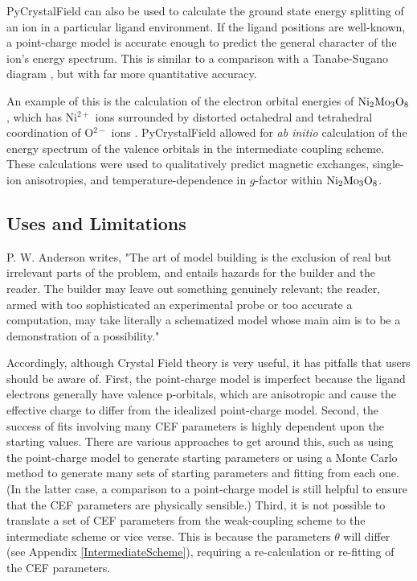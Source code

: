 \documentclass[twocolumn,english,prb]{revtex4-2}
\begin{document}
PyCrystalField can also be used to calculate the ground state energy splitting of an ion in a particular ligand environment. If the ligand positions are well-known, a point-charge model is accurate enough to predict the general character of the ion's energy spectrum. This is similar to a comparison with a Tanabe-Sugano diagram \cite{AbragamBleaney}, but with far more quantitative accuracy.

An example of this is the calculation of the electron orbital energies of $\rm Ni_2Mo_3O_8$, which has Ni$^{2+}$ ions surrounded by distorted octahedral and tetrahedral coordination of O$^{2-}$ ions \cite{JenHoneycomb}. PyCrystalField allowed for \textit{ab initio} calculation of the energy spectrum of the valence orbitals in the intermediate coupling scheme. These calculations were used to qualitatively predict magnetic exchanges, single-ion anisotropies, and temperature-dependence in $g$-factor within $\rm Ni_2Mo_3O_8$.

\subsection{Uses and Limitations}


P. W. Anderson writes,
"The art of model building is the exclusion of real but irrelevant parts of the problem, and entails hazards for the builder and the reader. The builder may leave out something genuinely relevant; the reader, armed with too sophisticated an experimental probe or too accurate a computation, may take literally a schematized model whose main aim is to be a demonstration of a possibility." \cite{anderson1978local}

Accordingly,
although Crystal Field theory is very useful, it has pitfalls that users should be aware of. First, the point-charge model is imperfect because the ligand electrons generally have valence p-orbitals, which are anisotropic and cause the effective charge to differ from the idealized point-charge model. Second, the success of fits involving many CEF parameters is highly dependent upon the starting values. There are various approaches to get around this, such as using the point-charge model to generate starting parameters or using a Monte Carlo method to generate many sets of starting parameters and fitting from each one. (In the latter case, a comparison to a point-charge model is still helpful to ensure that the CEF parameters are physically sensible.)
Third, it is not possible to translate a set of CEF parameters from the weak-coupling scheme to the intermediate scheme or vice verse. This is because the parameters $\theta$ will differ (see Appendix \ref{IntermediateScheme}), requiring a re-calculation or re-fitting of the CEF parameters.
\end{document}
